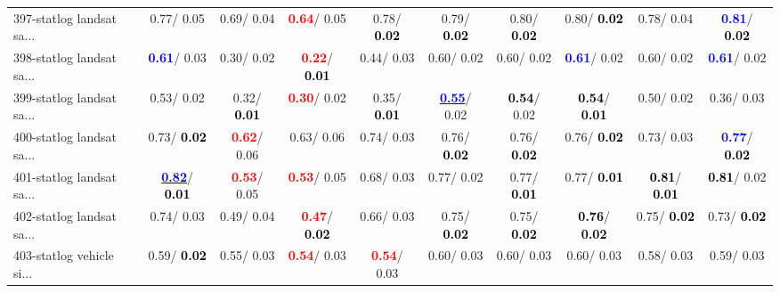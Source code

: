 \begin{table}[h]
\begin{center}
{\begin{tabular}{lc|c|c|c|c|c|c|c|c}
397-statlog landsat sa... &   0.77/  0.05 &   0.69/  0.04 & \textcolor{red}{\textbf{  0.64}}/  0.05 &   0.78/\textcolor{black}{\textbf{  0.02}} &   0.79/\textcolor{black}{\textbf{  0.02}} &   0.80/\textcolor{black}{\textbf{  0.02}} &   0.80/\textcolor{black}{\textbf{  0.02}} &   0.78/  0.04 & \textcolor{blue}{\textbf{  0.81}}/\textcolor{black}{\textbf{  0.02}} \\
398-statlog landsat sa... & \textcolor{blue}{\textbf{  0.61}}/  0.03 &   0.30/  0.02 & \textcolor{red}{\textbf{  0.22}}/\textcolor{black}{\textbf{  0.01}} &   0.44/  0.03 &   0.60/  0.02 &   0.60/  0.02 & \textcolor{blue}{\textbf{  0.61}}/  0.02 &   0.60/  0.02 & \textcolor{blue}{\textbf{  0.61}}/  0.02 \\ \hline
399-statlog landsat sa... &   0.53/  0.02 &   0.32/\textcolor{black}{\textbf{  0.01}} & \textcolor{red}{\textbf{  0.30}}/  0.02 &   0.35/\textcolor{black}{\textbf{  0.01}} & \underline{\textcolor{blue}{\textbf{  0.55}}}/  0.02 & \textcolor{black}{\textbf{  0.54}}/  0.02 & \textcolor{black}{\textbf{  0.54}}/\textcolor{black}{\textbf{  0.01}} &   0.50/  0.02 &   0.36/  0.03 \\
400-statlog landsat sa... &   0.73/\textcolor{black}{\textbf{  0.02}} & \textcolor{red}{\textbf{  0.62}}/  0.06 &   0.63/  0.06 &   0.74/  0.03 &   0.76/\textcolor{black}{\textbf{  0.02}} &   0.76/\textcolor{black}{\textbf{  0.02}} &   0.76/\textcolor{black}{\textbf{  0.02}} &   0.73/  0.03 & \textcolor{blue}{\textbf{  0.77}}/\textcolor{black}{\textbf{  0.02}} \\
401-statlog landsat sa... & \underline{\textcolor{blue}{\textbf{  0.82}}}/\textcolor{black}{\textbf{  0.01}} & \textcolor{red}{\textbf{  0.53}}/  0.05 & \textcolor{red}{\textbf{  0.53}}/  0.05 &   0.68/  0.03 &   0.77/  0.02 &   0.77/\textcolor{black}{\textbf{  0.01}} &   0.77/\textcolor{black}{\textbf{  0.01}} & \textcolor{black}{\textbf{  0.81}}/\textcolor{black}{\textbf{  0.01}} & \textcolor{black}{\textbf{  0.81}}/  0.02 \\
402-statlog landsat sa... &   0.74/  0.03 &   0.49/  0.04 & \textcolor{red}{\textbf{  0.47}}/\textcolor{black}{\textbf{  0.02}} &   0.66/  0.03 &   0.75/\textcolor{black}{\textbf{  0.02}} &   0.75/\textcolor{black}{\textbf{  0.02}} & \textcolor{black}{\textbf{  0.76}}/\textcolor{black}{\textbf{  0.02}} &   0.75/\textcolor{black}{\textbf{  0.02}} &   0.73/\textcolor{black}{\textbf{  0.02}} \\
403-statlog vehicle si... &   0.59/\textcolor{black}{\textbf{  0.02}} &   0.55/  0.03 & \textcolor{red}{\textbf{  0.54}}/  0.03 & \textcolor{red}{\textbf{  0.54}}/  0.03 &   0.60/  0.03 &   0.60/  0.03 &   0.60/  0.03 &   0.58/  0.03 &   0.59/  0.03 \\

\end{tabular}}
\end{center}
\end{table}
